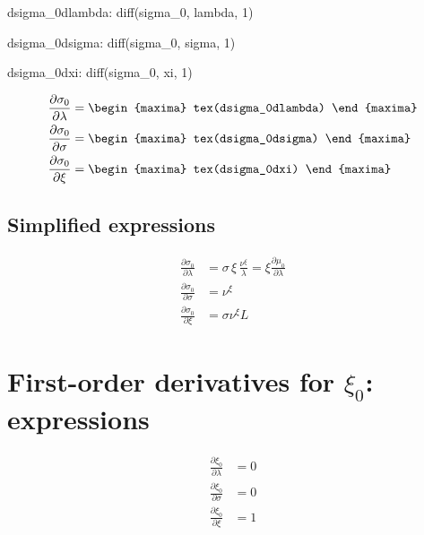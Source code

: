 \begin{maxima}
  dsigma_0dlambda: diff(sigma_0, lambda, 1)
\end{maxima}
\begin{maxima}
  dsigma_0dsigma: diff(sigma_0, sigma, 1)
\end{maxima}
\begin{maxima}
  dsigma_0dxi: diff(sigma_0, xi, 1)
\end{maxima}

{\color{MonVertF}
\begin{align*}
  \frac{\partial \sigma_0}{\partial \lambda}
  &=
    \begin{maxima}
      tex(dsigma_0dlambda)
    \end{maxima} \\
 \frac{\partial \sigma_0}{\partial \sigma}
  &=
    \begin{maxima}
      tex(dsigma_0dsigma)
    \end{maxima} \\
  \frac{\partial \sigma_0 }{\partial \xi}
  &= \begin{maxima}
      tex(dsigma_0dxi)
    \end{maxima} \\
\end{align*}
}

\subsection*{Simplified expressions}

{\color{red}
\begin{align*}
  \frac{\partial \sigma_0}{\partial \lambda}
  &= \sigma \, \xi \, \frac{\nu^\xi}{\lambda} = \xi \frac{\partial \mu_0}{\partial \lambda}\\
 \frac{\partial \sigma_0}{\partial \sigma}
  &= \nu^\xi\\
  \frac{\partial \sigma_0 }{\partial \xi}
  &= \sigma \nu^\xi L 
\end{align*}
}

\section{First-order derivatives for $\xi_0$: expressions}

{\color{red}
\begin{align*}
  \frac{\partial \xi_0}{\partial \lambda}
  &= 0\\
 \frac{\partial \xi_0}{\partial \sigma}
  &= 0\\
  \frac{\partial \xi_0 }{\partial \xi}
  &= 1
\end{align*}
}

